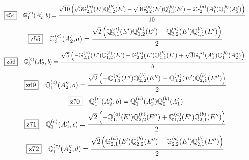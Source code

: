 \documentclass[fleqn,10pt,landscape]{jsarticle}
\begin{document}
\begin{dmath*}
\hspace*{3mm}\fbox{z54}\quad \mathbb{G}_{1}^{(c)}(A_{2}^{\prime},b)=\frac{\sqrt{10} \left(\sqrt{3} \mathbb{G}_{2,1}^{(a)}(E^{\prime}) \mathbb{Q}_{1,2}^{(b)}(E^{\prime}) - \sqrt{3} \mathbb{G}_{2,2}^{(a)}(E^{\prime}) \mathbb{Q}_{1,1}^{(b)}(E^{\prime}) + 2 \mathbb{G}_{2}^{(a)}(A_{1}^{\prime\prime}) \mathbb{Q}_{1}^{(b)}(A_{2}^{\prime\prime})\right)}{10}
\end{dmath*}
\begin{dmath*}
\hspace*{3mm}\fbox{z55}\quad \mathbb{G}_{3}^{(c)}(A_{2}^{\prime},a)=\frac{\sqrt{2} \left(\mathbb{Q}_{3,1}^{(a)}(E^{\prime}) \mathbb{Q}_{1,2}^{(b)}(E^{\prime}) - \mathbb{Q}_{3,2}^{(a)}(E^{\prime}) \mathbb{Q}_{1,1}^{(b)}(E^{\prime})\right)}{2}
\end{dmath*}
\begin{dmath*}
\hspace*{3mm}\fbox{z56}\quad \mathbb{G}_{3}^{(c)}(A_{2}^{\prime},b)=\frac{\sqrt{5} \left(- \mathbb{G}_{2,1}^{(a)}(E^{\prime}) \mathbb{Q}_{1,2}^{(b)}(E^{\prime}) + \mathbb{G}_{2,2}^{(a)}(E^{\prime}) \mathbb{Q}_{1,1}^{(b)}(E^{\prime}) + \sqrt{3} \mathbb{G}_{2}^{(a)}(A_{1}^{\prime\prime}) \mathbb{Q}_{1}^{(b)}(A_{2}^{\prime\prime})\right)}{5}
\end{dmath*}
\begin{dmath*}
\hspace*{3mm}\fbox{z69}\quad \mathbb{Q}_{1}^{(c)}(A_{2}^{\prime\prime},a)=\frac{\sqrt{2} \left(- \mathbb{Q}_{3,1}^{(a)}(E^{\prime}) \mathbb{Q}_{2,2}^{(b)}(E^{\prime\prime}) + \mathbb{Q}_{3,2}^{(a)}(E^{\prime}) \mathbb{Q}_{2,1}^{(b)}(E^{\prime\prime})\right)}{2}
\end{dmath*}
\begin{dmath*}
\hspace*{3mm}\fbox{z70}\quad \mathbb{Q}_{1}^{(c)}(A_{2}^{\prime\prime},b)=\mathbb{Q}_{1}^{(a)}(A_{2}^{\prime\prime}) \mathbb{Q}_{0}^{(b)}(A_{1}^{\prime})
\end{dmath*}
\begin{dmath*}
\hspace*{3mm}\fbox{z71}\quad \mathbb{Q}_{1}^{(c)}(A_{2}^{\prime\prime},c)=\frac{\sqrt{2} \left(- \mathbb{Q}_{1,1}^{(a)}(E^{\prime}) \mathbb{Q}_{2,2}^{(b)}(E^{\prime\prime}) + \mathbb{Q}_{1,2}^{(a)}(E^{\prime}) \mathbb{Q}_{2,1}^{(b)}(E^{\prime\prime})\right)}{2}
\end{dmath*}
\begin{dmath*}
\hspace*{3mm}\fbox{z72}\quad \mathbb{Q}_{1}^{(c)}(A_{2}^{\prime\prime},d)=\frac{\sqrt{2} \left(\mathbb{G}_{2,1}^{(a)}(E^{\prime}) \mathbb{Q}_{2,2}^{(b)}(E^{\prime\prime}) - \mathbb{G}_{2,2}^{(a)}(E^{\prime}) \mathbb{Q}_{2,1}^{(b)}(E^{\prime\prime})\right)}{2}
\end{dmath*}
\end{document}
